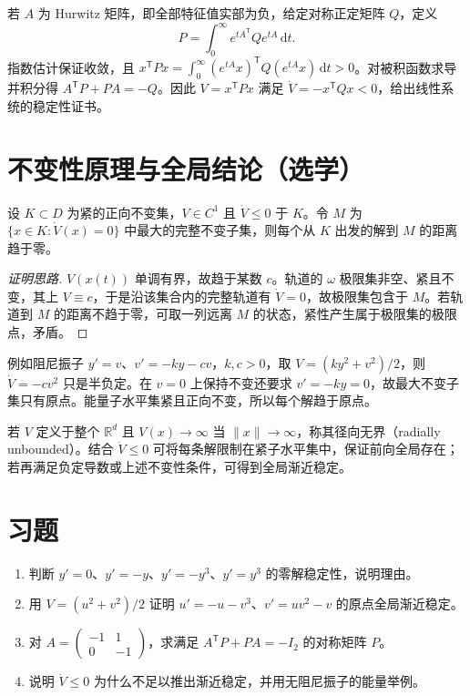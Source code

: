 \begin{example}[二次型的构造]
若 $A$ 为 Hurwitz 矩阵，即全部特征值实部为负，给定对称正定矩阵 $Q$，定义
\[
 P=\int_0^\infty e^{tA^{\mathsf T}}Qe^{tA}\,\mathrm dt.
\]
指数估计保证收敛，且 $x^{\mathsf T}Px=\int_0^\infty (e^{tA}x)^{\mathsf T}Q(e^{tA}x)\,\mathrm dt>0$。对被积函数求导并积分得 $A^{\mathsf T}P+PA=-Q$。因此 $V=x^{\mathsf T}Px$ 满足 $\dot V=-x^{\mathsf T}Qx<0$，给出线性系统的稳定性证书。
\end{example}

\section{不变性原理与全局结论（选学）}
\begin{theorem}
设 $K\subset D$ 为紧的正向不变集，$V\in C^1$ 且 $\dot V\leq0$ 于 $K$。令 $M$ 为 $\{x\in K:\dot V(x)=0\}$ 中最大的完整不变子集，则每个从 $K$ 出发的解到 $M$ 的距离趋于零。
\end{theorem}
\begin{proof}[证明思路]
$V(x(t))$ 单调有界，故趋于某数 $c$。轨道的 $\omega$ 极限集非空、紧且不变，其上 $V\equiv c$，于是沿该集合内的完整轨道有 $\dot V=0$，故极限集包含于 $M$。若轨道到 $M$ 的距离不趋于零，可取一列远离 $M$ 的状态，紧性产生属于极限集的极限点，矛盾。
\end{proof}

例如阻尼振子 $y'=v$、$v'=-ky-cv$，$k,c>0$，取 $V=(ky^2+v^2)/2$，则 $\dot V=-cv^2$ 只是半负定。在 $v=0$ 上保持不变还要求 $v'=-ky=0$，故最大不变子集只有原点。能量子水平集紧且正向不变，所以每个解趋于原点。

若 $V$ 定义于整个 $\mathbb R^d$ 且 $V(x)\to\infty$ 当 $\|x\|\to\infty$，称其径向无界（radially unbounded）。结合 $\dot V\leq0$ 可将每条解限制在紧子水平集中，保证前向全局存在；若再满足负定导数或上述不变性条件，可得到全局渐近稳定。

\section{习题}
\begin{enumerate}
 \item\label{ex:ode-stable} 判断 $y'=0$、$y'=-y$、$y'=-y^3$、$y'=y^3$ 的零解稳定性，说明理由。
 \item\label{ex:ode-lyapunov} 用 $V=(u^2+v^2)/2$ 证明 $u'=-u-v^3$、$v'=u v^2-v$ 的原点全局渐近稳定。
 \item 对 $A=\begin{pmatrix}-1&1\\0&-1\end{pmatrix}$，求满足 $A^{\mathsf T}P+PA=-I_2$ 的对称矩阵 $P$。
 \item 说明 $\dot V\leq0$ 为什么不足以推出渐近稳定，并用无阻尼振子的能量举例。
\end{enumerate}

